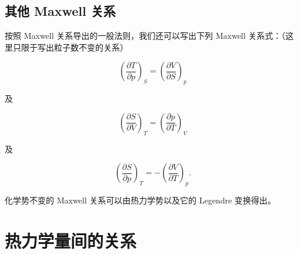 \subsection{其他 Maxwell 关系}
按照 Maxwell 关系导出的一般法则，我们还可以写出下列 Maxwell 关系式：（这里只限于写出粒子数不变的关系）
\begin{linenomath}\begin{equation}
\left( \frac{\partial T}{\partial p} \right)_S = \left( \frac{\partial V}{\partial S} \right)_p
\label{maxwell2}
\end{equation}\end{linenomath}
及
\begin{linenomath}\begin{equation}
\left( \frac{\partial S}{\partial V} \right)_T = \left( \frac{\partial p}{\partial T} \right)_V
\label{maxwell3}
\end{equation}\end{linenomath}
及
\begin{linenomath}\begin{equation}
\left( \frac{\partial S}{\partial p} \right)_T = -\left( \frac{\partial V}{\partial T} \right)_p.
\label{maxwell4}
\end{equation}\end{linenomath}
化学势不变的 Maxwell 关系可以由热力学势以及它的 Legendre 变换得出。

\section{热力学量间的关系}
